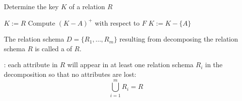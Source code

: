      \begin{algorithm}[H]
        \caption{Determine the key $K$ of a relation $R$}
        \begin{algorithmic}[1]
          \State $K := R$
            \State Compute $(K - A)^+$ with respect to $F$
              \State $K := K - \{A\}$
            \EndIf
          \EndFor
        \end{algorithmic}
      \end{algorithm}

    \par The relation schema $D = \{R_1, \ldots, R_m\}$ resulting from decomposing the relation schema $R$ is called a  of $R$.
    \par {}: each attribute in $R$ will appear in at least one relation schema $R_i$ in the decomposition so that no attributes are lost:
    \[
      \bigcup\limits_{i = 1}^{m} R_i = R
    \]